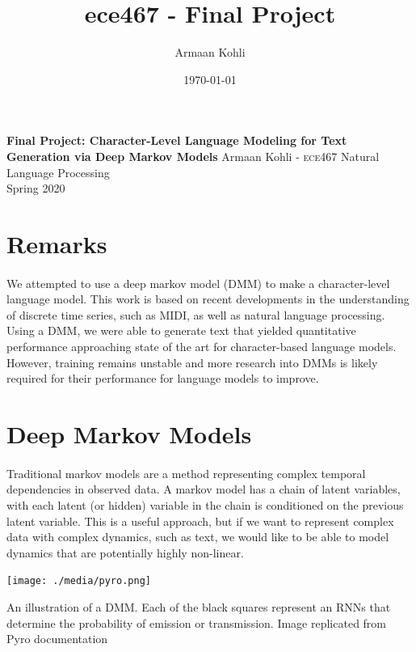 \documentclass[justified,nobib]{tufte-handout}
\title{ece467 - Final Project}
\author{Armaan Kohli}
\date{\today}
\begin{document}
\begin{fullwidth}
{
  \noindent\fontsize{12pt}{20pt}\selectfont\textbf{Final Project: Character-Level Language Modeling for Text Generation via Deep Markov Models}
  \newline
  \fontsize{12pt}{18pt}\selectfont
  {Armaan Kohli - \scshape ece}467 Natural Language Processing \\Spring 2020\\
}
\raggedright
\raggedbottom
\section{Remarks}
\paragraph{} We attempted to use a deep markov model (DMM) to make a character-level language model. This work is based on recent developments in the understanding of discrete time series, such as MIDI, as well as natural language processing. Using a DMM, we were able to generate text that yielded quantitative performance approaching state of the art for character-based language models. However, training remains unstable and more research into DMMs is likely required for their performance for language models to improve. 

\section{Deep Markov Models}
\paragraph{}
Traditional markov models are a method representing complex temporal dependencies in observed data. A markov model has a chain of latent variables, with each latent (or hidden) variable in the chain is conditioned on the previous latent variable. This is a useful approach, but if we want to represent complex data with complex dynamics, such as text, we would like to be able to model dynamics that are potentially highly non-linear.
\end{fullwidth}
\begin{marginfigure}[1.5in]
\texttt{[image: ./media/pyro.png]}
\caption{An illustration of a DMM. Each of the black squares represent an RNNs that determine the probability of emission or transmission. Image replicated from Pyro documentation \cite{pyro}}
\label{fig:dmm}
\end{marginfigure}
\end{document}

